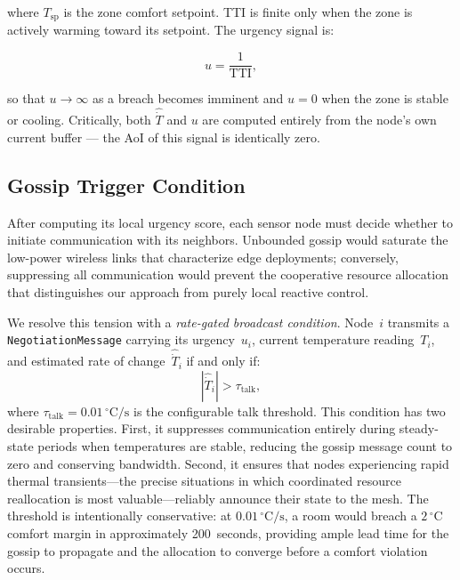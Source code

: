 \documentclass[conference]{IEEEtran}
\begin{document}
where $T_{\text{sp}}$ is the zone comfort setpoint.  TTI is finite only when
the zone is actively warming toward its setpoint.  The urgency signal is:

\begin{equation}
  u = \frac{1}{\text{TTI}},
  \label{eq:urgency}
\end{equation}

so that $u \to \infty$ as a breach becomes imminent and $u = 0$ when the zone
is stable or cooling.  Critically, both $\hat{\dot{T}}$ and $u$ are computed
entirely from the node's own current buffer --- the AoI of this signal is
identically zero.

\subsection{Gossip Trigger Condition}

After computing its local urgency score, each sensor node must decide whether to initiate communication with its neighbors. Unbounded gossip would saturate the low-power wireless links that characterize edge deployments; conversely, suppressing all communication would prevent the cooperative resource allocation that distinguishes our approach from purely local reactive control.

We resolve this tension with a \textit{rate-gated broadcast condition}. Node~$i$ transmits a \texttt{NegotiationMessage} carrying its urgency~$u_i$, current temperature reading~$T_i$, and estimated rate of change~$\hat{\dot{T}}_i$ if and only if:
\begin{equation}
    |\hat{\dot{T}}_i| > \tau_{\text{talk}},
    \label{eq:talk_threshold}
\end{equation}
where $\tau_{\text{talk}} = 0.01\,^\circ\text{C/s}$ is the configurable talk threshold. This condition has two desirable properties. First, it suppresses communication entirely during steady-state periods when temperatures are stable, reducing the gossip message count to zero and conserving bandwidth. Second, it ensures that nodes experiencing rapid thermal transients---the precise situations in which coordinated resource reallocation is most valuable---reliably announce their state to the mesh. The threshold is intentionally conservative: at $0.01\,^\circ\text{C/s}$, a room would breach a $2\,^\circ\text{C}$ comfort margin in approximately 200~seconds, providing ample lead time for the gossip to propagate and the allocation to converge before a comfort violation occurs.
\end{document}
